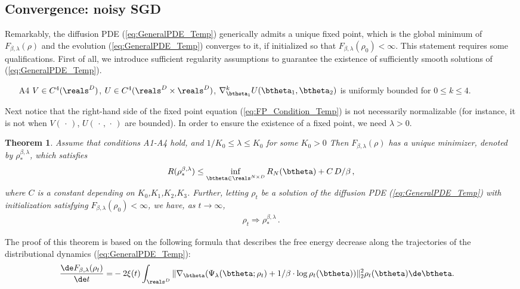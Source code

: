 \documentclass[11pt]{article}
\newtheorem{theorem}{Theorem}
\renewcommand{\eqref}[1]{(\ref{#1})}
\begin{document}
\subsection{Convergence: noisy SGD}

Remarkably, the diffusion PDE \eqref{eq:GeneralPDE_Temp} generically
admits a unique fixed point, which is the global minimum of  $F_{\beta,\lambda}(\rho)$
and the evolution \eqref{eq:GeneralPDE_Temp} converges to it, if initialized so that $F_{\beta, \lambda}(\rho_0) <\infty$. 
This statement requires some qualifications. 
 First of all, we introduce sufficient regularity assumptions to
guarantee the existence of sufficiently smooth solutions of \eqref{eq:GeneralPDE_Temp}.
%
\begin{enumerate}
\item[{\sf A4}] $V \in C^4(\reals^D)$, $U \in C^4(\reals^D \times \reals^D)$, $\nabla^k_{\btheta_1} U(\btheta_1, \btheta_2)$ is uniformly bounded for $0 \le k \le 4$. 
\end{enumerate}
%
Next notice that the right-hand side of the fixed point equation \eqref{eq:FP_Condition_Temp}
is not necessarily normalizable (for instance, it is not when $V(\,\cdot\,)$, $U(\,\cdot\, ,\,\cdot\,)$ are bounded).
 In order to ensure the existence of a fixed point, we need $\lambda>0$.
%
\begin{theorem}\label{thm:GeneralPDE_Noisy_fixed_point}
Assume that conditions {\sf A1}-{\sf A4} hold, and $1/K_0\le \lambda\le K_0$ for some $K_0>0$
Then $F_{\beta,\lambda}(\rho)$ has a unique minimizer, denoted by $\rho_*^{\beta,\lambda}$, which satisfies 
%
\begin{align}
R(\rho_*^{\beta,\lambda}) \le \inf_{\btheta\in\reals^{N\times D}} R_{N}(\btheta) + C\, D/\beta\, ,
\end{align}
%
where $C$ is a constant depending on $K_0$,$K_1$,$K_2$,$K_3$.
Further, letting $\rho_t$ be a solution of the diffusion PDE \eqref{eq:GeneralPDE_Temp} with initialization satisfying $F_{\beta,\lambda}(\rho_0)<\infty$,
we have, as $t\to\infty$,
%
\begin{align}
\rho_t\Rightarrow \rho_*^{\beta,\lambda}\, .
\end{align}
\end{theorem}
%
The proof of this theorem is based on the following formula that describes the free energy decrease along the 
trajectories of the distributional dynamics \eqref{eq:GeneralPDE_Temp}:
%
\begin{align}\label{eqn:F_non_increasing_bis}
\frac{\de F_{\beta, \lambda}(\rho_t)}{\de t} =& - 2 \xi(t) \int_{\reals^D} \| \nabla_\btheta (\Psi_\lambda(\btheta; \rho_t) + 1/\beta \cdot \log \rho_t(\btheta))\|_2^2 \rho_t(\btheta) \de \btheta.
\end{align}
\end{document}
